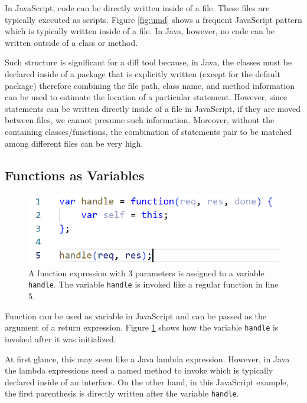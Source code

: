 \documentclass[letterpaper,12pt,onecolumn,final]{report}
\begin{document}
In JavaScript, code can be directly written inside of a file. These files are typically executed as scripts. Figure \ref{fig:umd} shows a frequent JavaScript pattern which is typically written inside of a file. In Java, however, no code can be written outside of a class or method.

Such structure is significant for a diff tool because, in Java, the classes must be declared inside of a package that is explicitly written (except for the default package) therefore combining the file path, class name, and method information can be used to estimate the location of a particular statement. However, since statements can be written directly inside of a file in JavaScript, if they are moved between files, we cannot presume such information. Moreover, without the containing classes/functions, the combination of statements pair to be matched among different files can be very high.

\subsection {Functions as Variables}

\begin{figure}
\includegraphics[width=\textwidth,height=\textheight,keepaspectratio]{images/functionvar.PNG}
  \caption{A function expression with 3 parameters is assigned to a variable \texttt{handle}. The variable \texttt{handle} is invoked like a regular function in line 5.}
   \label{fig:functionvar}
\end{figure} 

Function can be used as variable in JavaScript and can be passed as the argument of a return expression. Figure \ref{fig:functionvar} shows how the variable \texttt{handle} is invoked after it was initialized.

At first glance, this may seem like a Java lambda expression. However, in Java the lambda expressions need a named method to invoke which is typically declared inside of an interface. On the other hand, in this JavaScript example, the first parenthesis is directly written after the variable \texttt{handle}.
\end{document}
